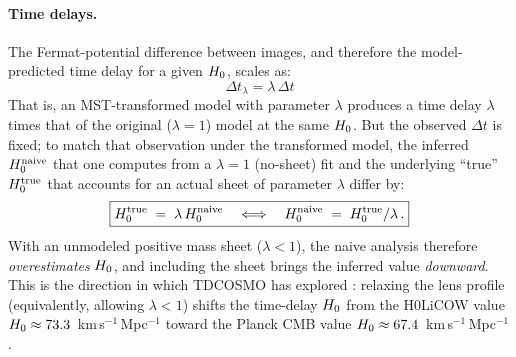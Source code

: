 \paragraph{Time delays.}
The Fermat-potential difference between images, and therefore the
model-predicted time delay for a given $H_0$, scales as:
\begin{equation}
    \boxed{
    \Delta t_\lambda = \lambda\,\Delta t
    }
    \label{eq:mst_time_delay}
\end{equation}
That is, an MST-transformed model with parameter $\lambda$ produces a
time delay $\lambda$ times that of the original ($\lambda = 1$) model at
the same $H_0$.  But the observed $\Delta t$ is fixed; to match
that observation under the transformed model, the inferred
$H_0^{\mathrm{naive}}$ that one computes from a $\lambda = 1$
(no-sheet) fit and the underlying ``true'' $H_0^{\mathrm{true}}$
that accounts for an actual sheet of parameter $\lambda$ differ by:
\begin{equation}
    \boxed{
    H_0^{\mathrm{true}} \;=\; \lambda\,H_0^{\mathrm{naive}}
    \quad\Longleftrightarrow\quad
    H_0^{\mathrm{naive}} \;=\; H_0^{\mathrm{true}} / \lambda \,.
    }
    \label{eq:mst_H0}
\end{equation}
With an unmodeled positive mass sheet ($\lambda < 1$), the naive
analysis therefore \emph{overestimates} $H_0$, and including the
sheet brings the inferred value \emph{downward}.  This is the direction
in which TDCOSMO has explored \citep{Birrer2020}: relaxing the lens
profile (equivalently, allowing $\lambda < 1$) shifts the time-delay
$H_0$ from the H0LiCOW value
$H_0 \approx 73.3$~km\,s$^{-1}$\,Mpc$^{-1}$ toward the Planck CMB
value $H_0 \approx 67.4$~km\,s$^{-1}$\,Mpc$^{-1}$.

